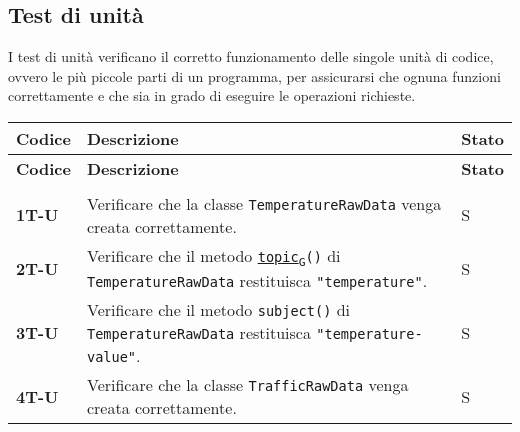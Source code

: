 \subsection{Test di unità}
I test di unità verificano il corretto funzionamento delle singole unità di codice, ovvero le più piccole parti di un programma,
per assicurarsi che ognuna funzioni correttamente e che sia in grado di eseguire le operazioni richieste. \\
\begin{longtable}{|>{\raggedright\arraybackslash}m{}|>{\raggedright\arraybackslash}m{}|>{\raggedright\arraybackslash}m{}|}
	\hline
	\textbf{Codice} & \textbf{Descrizione}                                                                                                                                                                                                                             & \textbf{Stato} \\
	\hline
	\endfirsthead
	\hline
	\textbf{Codice} & \textbf{Descrizione}                                                                                                                                                                                                                             & \textbf{Stato} \\
	\endhead
	\multicolumn{3}{|c|}{\textbf{Python}} \\
	\hline
	\textbf{1T-U}   & Verificare che la classe \texttt{TemperatureRawData} venga creata correttamente.                                                                                                                                                                 & S              \\
	\hline
	\textbf{2T-U}   & Verificare che il metodo \texttt{\href{https://7last.github.io/docs/rtb/documentazione-interna/glossario\#topic}{topic\textsubscript{G}}()} di \texttt{TemperatureRawData} restituisca \texttt{"temperature"}.                                   & S              \\
	\hline
	\textbf{3T-U}   & Verificare che il metodo \texttt{subject()} di \texttt{TemperatureRawData} restituisca \texttt{"temperature-value"}.                                                                                                                             & S              \\
	\hline
	\textbf{4T-U}   & Verificare che la classe \texttt{TrafficRawData} venga creata correttamente.                                                                                                                                                                     & S              \\

\end{longtable}
